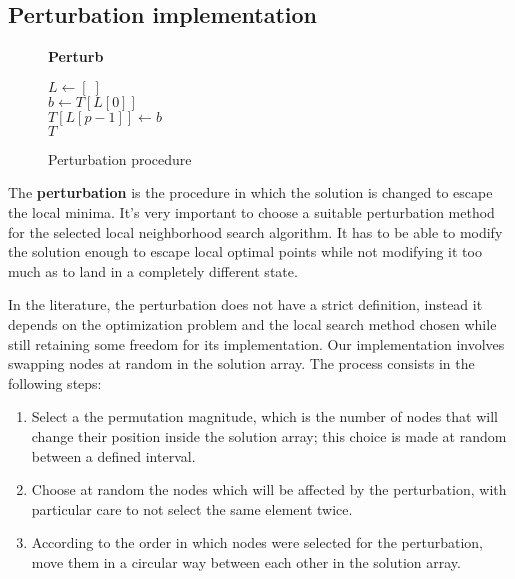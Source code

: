 \subsection{Perturbation implementation}

\begin{figure}[htbp]
    \textbf{Perturb} \\
    \begin{algorithm}[H]
        \BlankLine
        $L \gets [\;]$\\
        \For{$i \in \{0,1,\dots,p-1\}$}{
            \BlankLine
            $r \gets $ random in range $[0,|T|)$\\
            \lWhile{$r \in L$}{$r \gets $ random in range $[0,|T|)$}
            $L \gets L \cup \{r\}$
        }
        \BlankLine
        $b \gets T[L[0]]$\\
        \BlankLine
        \BlankLine
        $T[L[p-1]] \gets b$\\
        \BlankLine
        \Return $T$
    \end{algorithm}
    \caption{Perturbation procedure} \label{fig:vnsPerturbPseudocode}
\end{figure}

The \textbf{perturbation} is the procedure in which the solution is changed to escape the local minima.
It's very important to choose a suitable perturbation method for the selected local neighborhood search algorithm.
It has to be able to modify the solution enough to escape local optimal points while not modifying it too much as to land in a completely different state.

In the literature, the perturbation does not have a strict definition, instead it depends on the optimization problem and the local search method chosen while still retaining some freedom for its implementation.
Our implementation involves swapping nodes at random in the solution array.
The process consists in the following steps:
\begin{enumerate}
    \item Select a the permutation magnitude, which is the number of nodes that will change their position inside the solution array; this choice is made at random between a defined interval.
    \item Choose at random the nodes which will be affected by the perturbation, with particular care to not select the same element twice.
    \item According to the order in which nodes were selected for the perturbation, move them in a circular way between each other in the solution array.
\end{enumerate}

